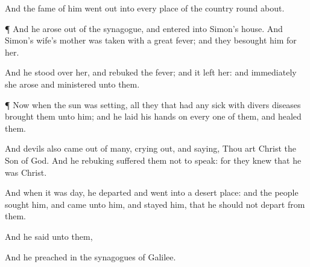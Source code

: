 {And the
fame
of
him went
out
into
every
place of the country round
about.


\par }{\PP {}¶
And he
arose out
of the
synagogue, and
entered
into
Simon’s
house.
And
Simon’s
wife’s mother
was taken
with a
great
fever;
and they
besought
him
for
her.

And he
stood
over
her, and
rebuked the
fever;
and it
left
her:
and
immediately she
arose and
ministered unto
them.


\par }{\PP {}¶ Now
when the
sun was
setting,
all they
that
had any
sick with
divers
diseases
brought
them
unto
him;
and he
laid his
hands on
every
one of
them, and
healed
them.

And
devils
also came
out
of
many, crying
out,
and
saying,
Thou
art
Christ the
Son of
God.
And he
rebuking
{}
suffered
them
not to
speak:
for they
knew that
he
was
Christ.

And when it
was
day, he
departed and
went
into a
desert
place:
and the
people
sought
him,
and
came
unto
him,
and
stayed
him, that he should
not
depart
from
them.

And he
said
unto
them,
{}

And he
preached
in the
synagogues of
Galilee.




\par }
